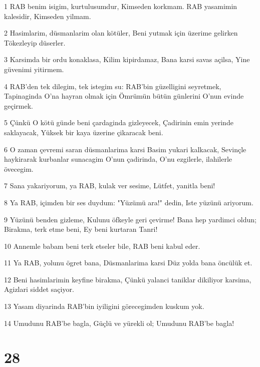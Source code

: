 \par 1 RAB benim isigim, kurtulusumdur, Kimseden korkmam. RAB yasamimin kalesidir, Kimseden yilmam.
\par 2 Hasimlarim, düsmanlarim olan kötüler, Beni yutmak için üzerime gelirken Tökezleyip düserler.
\par 3 Karsimda bir ordu konaklasa, Kilim kipirdamaz, Bana karsi savas açilsa, Yine güvenimi yitirmem.
\par 4 RAB'den tek dilegim, tek istegim su: RAB'bin güzelligini seyretmek, Tapinaginda O'na hayran olmak için Ömrümün bütün günlerini O'nun evinde geçirmek.
\par 5 Çünkü O kötü günde beni çardaginda gizleyecek, Çadirinin emin yerinde saklayacak, Yüksek bir kaya üzerine çikaracak beni.
\par 6 O zaman çevremi saran düsmanlarima karsi Basim yukari kalkacak, Sevinçle haykirarak kurbanlar sunacagim O'nun çadirinda, O'nu ezgilerle, ilahilerle övecegim.
\par 7 Sana yakariyorum, ya RAB, kulak ver sesime, Lütfet, yanitla beni!
\par 8 Ya RAB, içimden bir ses duydum: "Yüzümü ara!" dedin, Iste yüzünü ariyorum.
\par 9 Yüzünü benden gizleme, Kulunu öfkeyle geri çevirme! Bana hep yardimci oldun; Birakma, terk etme beni, Ey beni kurtaran Tanri!
\par 10 Annemle babam beni terk etseler bile, RAB beni kabul eder.
\par 11 Ya RAB, yolunu ögret bana, Düsmanlarima karsi Düz yolda bana öncülük et.
\par 12 Beni hasimlarimin keyfine birakma, Çünkü yalanci taniklar dikiliyor karsima, Agizlari siddet saçiyor.
\par 13 Yasam diyarinda RAB'bin iyiligini görecegimden kuskum yok.
\par 14 Umudunu RAB'be bagla, Güçlü ve yürekli ol; Umudunu RAB'be bagla!

\chapter{28}

